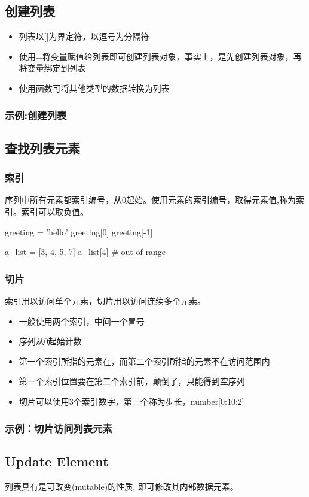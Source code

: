 \subsection{创建列表}
\begin{itemize}
\item 列表以[]为界定符，以逗号为分隔符
\item 使用=将变量赋值给列表即可创建列表对象，事实上，是先创建列表对象，再将变量绑定到列表
\item 使用函数可将其他类型的数据转换为列表
\end{itemize}
\subsubsection{示例:创建列表}
\subsection{查找列表元素}
\subsubsection{索引}
序列中所有元素都索引编号，从0起始。使用元素的索引编号，取得元素值,称为索引。索引可以取负值。
\begin{python}
greeting = 'hello'
greeting[0]
greeting[-1]

a_list = [3, 4, 5, 7]
a_list[4] # out of range
\end{python}
\subsubsection{切片}
索引用以访问单个元素，切片用以访问连续多个元素。
\begin{itemize}
\item 一般使用两个索引，中间一个冒号
\item 序列从0起始计数
\item 第一个索引所指的元素在，而第二个索引所指的元素不在访问范围内
\item 第一个索引位置要在第二个索引前，颠倒了，只能得到空序列
\item 切片可以使用3个索引数字，第三个称为步长，number[0:10:2]
\end{itemize}
\subsubsection{示例：切片访问列表元素}
\subsection{Update Element}
列表具有是可改变(mutable)的性质, 即可修改其内部数据元素。
